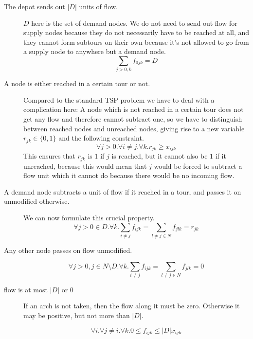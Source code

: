 \begin{description}
  \item[The depot sends out $|D|$ units of flow.] $D$ here is the set of demand nodes. We do 
  not need to send out flow for supply nodes because they do not necessarily have to be
  reached at all, and they cannot form subtours on their own because it's not allowed to 
  go from a supply node to anywhere but a demand node.
     \begin{equation}
       \sum_{j>0,k} f_{0jk} = D
     \end{equation}

  \item[A node is either reached in a certain tour or not.]
     Compared to the standard TSP problem we have to deal with a complication here: A node which 
     is not reached in a certain tour does not get any flow and therefore cannot subtract one,
     so we have to distinguish between reached nodes and unreached nodes, giving rise to a new
     variable $r_{jk} \in \{0,1\}$ and the following constraint.
     \begin{equation}
        \forall j>0. \forall i \neq j. \forall k. r_{jk} \geq x_{ijk}
     \end{equation}
     This ensures that $r_{jk}$ is $1$ if $j$ is reached, but it cannot also be $1$ if it unreached,
     because this would mean that $j$ would be forced to subtract a flow unit which it cannot
     do because there would be no incoming flow.

  \item[A demand node subtracts a unit of flow if it reached in a tour, and passes it on unmodified
        otherwise.] We can now formulate this crucial property.
  \begin{equation}
        \forall j>0 \in D. \forall k. \sum_{i \neq j} f_{ijk} = \sum_{l \neq j \in N} f_{jlk} = r_{jk}
  \end{equation}

  \item[Any other node passes on flow unmodified.]
  \begin{equation}
        \forall j>0, j \in N \setminus D. \forall k. \sum_{i \neq j} f_{ijk} = \sum_{l \neq j \in N} f_{jlk} = 0
  \end{equation}

  \item[flow is at most $|D|$ or $0$] 

  If an arch is not taken, then the flow along it must be zero. Otherwise it may be positive, but 
  not more than $|D|$.

  \begin{equation}
        \forall i. \forall j \neq i. \forall k. 0 \leq f_{ijk} \leq |D| x_{ijk}
  \end{equation}
\end{description}

